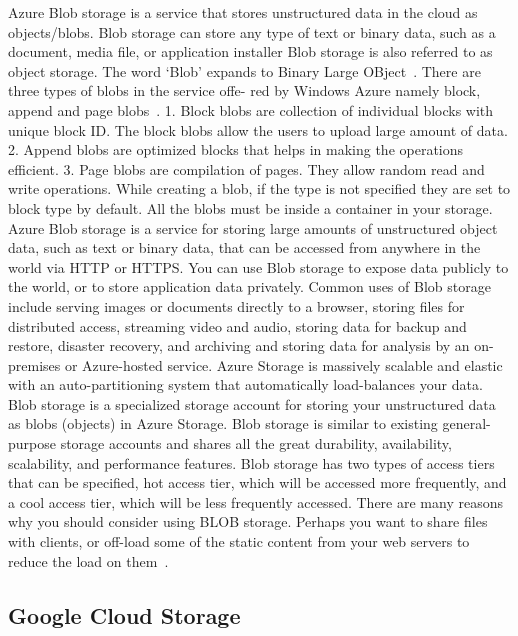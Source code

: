 {Azure Blob storage is a service that stores unstructured data in the
cloud as objects/blobs. Blob storage can store any type of text or
binary data, such as a document, media file, or application installer
Blob storage is also referred to as object storage. The word ‘Blob’
expands to Binary Large OBject~\cite{www-azure-3}. There are three
types of blobs in the service offe- red by Windows Azure namely block,
append and page blobs~\cite{www-azure-2}.  1. Block blobs are
collection of individual blocks with unique block ID.  The block blobs
allow the users to upload large amount of data.  2. Append blobs are
optimized blocks that helps in making the operations efficient.
3. Page blobs are compilation of pages. They allow random read and
write operations. While creating a blob, if the type is not specified
they are set to block type by default. All the blobs must be inside a
container in your storage.  Azure Blob storage is a service for
storing large amounts of unstructured object data, such as text or
binary data, that can be accessed from anywhere in the world via HTTP
or HTTPS. You can use Blob storage to expose data publicly to the
world, or to store application data privately. Common uses of Blob
storage include serving images or documents directly to a browser,
storing files for distributed access, streaming video and audio,
storing data for backup and restore, disaster recovery, and archiving
and storing data for analysis by an on-premises or Azure-hosted
service.  Azure Storage is massively scalable and elastic with an
auto-partitioning system that automatically load-balances your
data. Blob storage is a specialized storage account for storing your
unstructured data as blobs (objects) in Azure Storage. Blob storage is
similar to existing general-purpose storage accounts and shares all
the great durability, availability, scalability, and performance
features. Blob storage has two types of access tiers that can be
specified, hot access tier, which will be accessed more frequently,
and a cool access tier, which will be less frequently accessed. There
are many reasons why you should consider using BLOB storage. Perhaps
you want to share files with clients, or off-load some of the static
content from your web servers to reduce the load on
them~\cite{www-azure-3}.

     \pv

\subsection{Google Cloud Storage}

}
